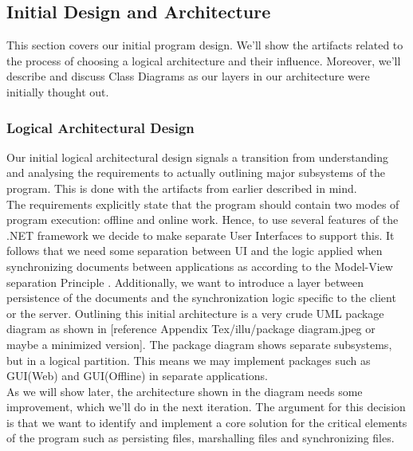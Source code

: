 \subsection{Initial Design and Architecture}
This section covers our initial program design. We’ll show the artifacts related to the process of choosing a logical architecture and their influence. Moreover, we’ll describe and discuss Class Diagrams as our layers in our architecture were initially thought out. 
\subsubsection{Logical Architectural Design}
Our initial logical architectural design signals a transition from understanding and analysing the requirements to actually outlining major subsystems of the program. This is done with the artifacts from earlier described in mind.\\
The requirements explicitly state that the program should contain two modes of program execution: offline and online work. Hence, to use several features of the .NET framework we decide to make separate User Interfaces to support this. It follows that we need some separation between UI and the logic applied when synchronizing documents between applications as according to the Model-View separation Principle \cite[p.~209]{OOAD}. Additionally, we want to introduce a layer between persistence of the documents and the synchronization logic specific to the client or the server. Outlining this initial architecture is a very crude UML package diagram as shown in [reference Appendix Tex/illu/package diagram.jpeg or maybe a minimized version]. 
The package diagram shows separate subsystems, but in a logical partition. This means we may implement packages such as GUI(Web) and GUI(Offline) in separate applications.\\
As we will show later, the architecture shown in the diagram needs some improvement, which we’ll do in the next iteration. The argument for this decision is that we want to identify and implement a core solution for the critical elements of the program such as persisting files, marshalling files and synchronizing files.\\
